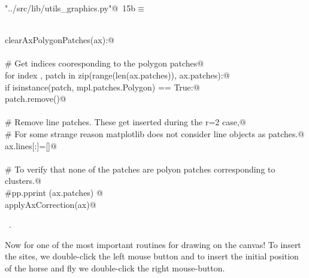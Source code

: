 \documentclass[11.5pt]{report}
\begin{document}
\begin{flushleft} \small\label{scrap6}\raggedright\small
{} \verb@"../src/lib/utils_graphics.py"@\nobreak\ {\footnotesize {15b}}$\equiv$
\vspace{-1ex}
\begin{list}{}{} \item
\mbox{}\verb@@\\
\mbox{}\verb@def clearAxPolygonPatches(ax):@\\
\mbox{}\verb@@\\
\mbox{}\verb@    # Get indices cooresponding to the polygon patches@\\
\mbox{}\verb@    for index , patch in zip(range(len(ax.patches)), ax.patches):@\\
\mbox{}\verb@        if isinstance(patch, mpl.patches.Polygon) == True:@\\
\mbox{}\verb@            patch.remove()@\\
\mbox{}\verb@@\\
\mbox{}\verb@    # Remove line patches. These get inserted during the r=2 case,@\\
\mbox{}\verb@    # For some strange reason matplotlib does not consider line objects as patches.@\\
\mbox{}\verb@    ax.lines[:]=[]@\\
\mbox{}\verb@@\\
\mbox{}\verb@    # To verify that none of the patches are polyon patches corresponding to clusters.@\\
\mbox{}\verb@    #pp.pprint (ax.patches) @\\
\mbox{}\verb@    applyAxCorrection(ax)@\\
\mbox{}\verb@@{\NWsep}
\end{list}
\vspace{-1.5ex}
\footnotesize
\begin{list}{}{\setlength{\itemsep}{-\parsep}\setlength{\itemindent}{-\leftmargin}}
\item \NWtxtFileDefBy\ .

\item{}
\end{list}
\vspace{4ex}
\end{flushleft}
\newchunk Now for one of the most important routines for drawing on the canvas! 
To insert the sites, we double-click the left mouse button and to insert the 
initial position of the horse and fly we double-click the right mouse-button. 
\end{document}
